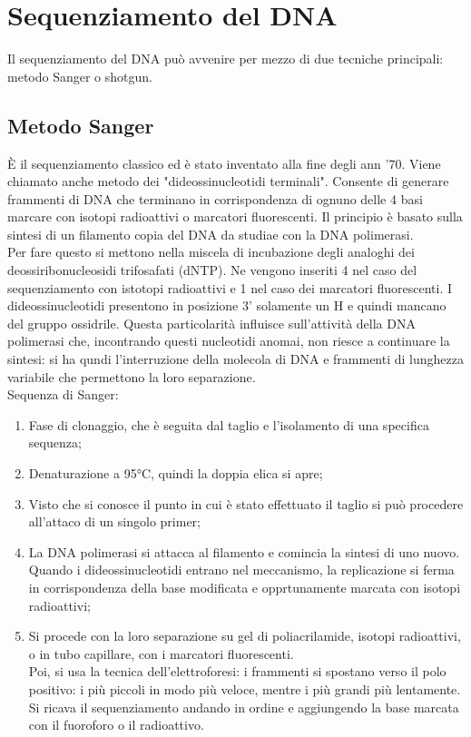 \section{Sequenziamento del DNA}
Il sequenziamento del DNA pu\`o avvenire per mezzo di due tecniche principali: metodo Sanger o shotgun.
\subsection{Metodo Sanger}
\`E il sequenziamento classico ed \`e stato inventato alla fine degli ann '70. Viene chiamato anche metodo dei "dideossinucleotidi terminali". Consente di generare frammenti di DNA che terminano in corrispondenza di ognuno delle 4 basi marcare con isotopi radioattivi o marcatori fluorescenti. Il principio \`e basato sulla sintesi di un filamento copia del DNA da studiae con la DNA polimerasi.
\\Per fare questo si mettono nella miscela di incubazione degli analoghi dei deossiribonucleosidi trifosafati (dNTP). Ne vengono inseriti 4 nel caso del sequenziamento con istotopi radioattivi e 1 nel caso dei marcatori fluorescenti. I dideossinucleotidi presentono in posizione 3' solamente un H e quindi mancano del gruppo ossidrile. Questa particolarit\`a influisce sull'attivit\`a della DNA polimerasi che, incontrando questi nucleotidi anomai, non riesce a continuare la sintesi: si ha qundi l'interruzione della molecola di DNA e frammenti di lunghezza variabile che permettono la loro separazione.
\\Sequenza di Sanger:
\begin{enumerate}
    \item Fase di clonaggio, che \`e seguita dal taglio e l'isolamento di una specifica sequenza;
    \item Denaturazione a 95°C, quindi la doppia elica si apre;
    \item Visto che si conosce il punto in cui \`e stato effettuato il taglio si pu\`o procedere all'attaco di un singolo primer;
    \item La DNA polimerasi si attacca al filamento e comincia la sintesi di uno nuovo. Quando i dideossinucleotidi entrano nel meccanismo, la replicazione si ferma in corrispondenza della base modificata e opprtunamente marcata con isotopi radioattivi;
    \item Si procede con la loro separazione su gel di poliacrilamide, isotopi radioattivi, o in tubo capillare, con i marcatori fluorescenti. 
    \\Poi, si usa la tecnica dell'elettroforesi: i frammenti si spostano verso il polo positivo: i pi\`u piccoli in modo pi\`u veloce, mentre i pi\`u grandi pi\`u lentamente. Si ricava il sequenziamento andando in ordine e aggiungendo la base marcata con il fuoroforo o il radioattivo.
\end{enumerate}
